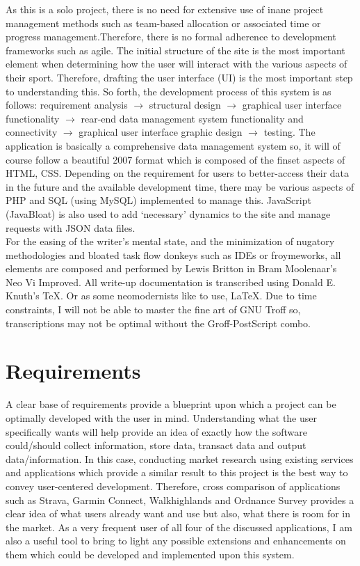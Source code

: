 \documentclass[11pt, english]{article}
\begin{document}
	As this is a solo project, there is no need for extensive use of inane project management methods such as team-based allocation or associated time or progress management.Therefore, there is no formal adherence to development frameworks such as agile. The initial structure of the site is the most important element when determining how the user will interact with the various aspects of their sport. Therefore, drafting the user interface (UI) is the most important step to understanding this. So forth, the development process of this system is as follows: requirement analysis $\rightarrow$ structural design $\rightarrow$ graphical user interface functionality $\rightarrow$ rear-end data management system functionality and connectivity $\rightarrow$ graphical user interface graphic design $\rightarrow$ testing. The application is basically a comprehensive data management system so, it will of course follow a beautiful 2007 format which is composed of the finset aspects of HTML, CSS. Depending on the requirement for users to better-access their data in the future and the available development time, there may be various aspects of PHP and SQL (using MySQL) implemented to manage this. JavaScript (JavaBloat) is also used to add `necessary' dynamics to the site and manage requests with JSON data files.\\

	For the easing of the writer's mental state, and the minimization of nugatory methodologies and bloated task flow donkeys such as IDEs or froymeworks, all elements are composed and performed by Lewis Britton in Bram Moolenaar's Neo Vi Improved. All write-up documentation is transcribed using Donald E. Knuth's \TeX. Or as some neomodernists like to use, \LaTeX. Due to time constraints, I will not be able to master the fine art of GNU Troff so, transcriptions may not be optimal without the Groff-PostScript combo.

\newpage

\section{Requirements}

	A clear base of requirements provide a blueprint upon which a project can be optimally developed with the user in mind. Understanding what the user specifically wants will help provide an idea of exactly how the software could/should collect information, store data, transact data and output data/information. In this case, conducting market research using existing services and applications which provide a similar result to this project is the best way to convey user-centered development. Therefore, cross comparison of applications such as Strava, Garmin Connect, Walkhighlands and Ordnance Survey provides a clear idea of what users already want and use but also, what there is room for in the market. As a very frequent user of all four of the discussed applications, I am also a useful tool to bring to light any possible extensions and enhancements on them which could be developed and implemented upon this system.
\end{document}
